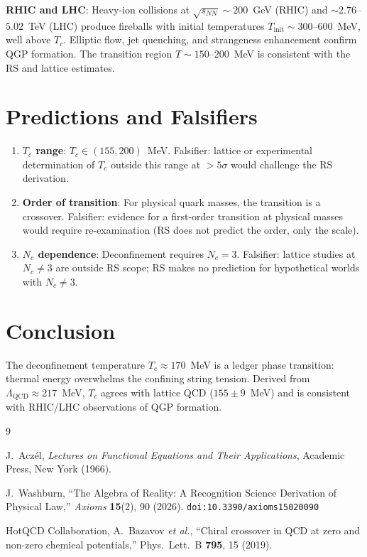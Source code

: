 \documentclass[12pt,a4paper]{article}
\theoremstyle{definition}
\theoremstyle{remark}
\begin{document}
\textbf{RHIC and LHC}: Heavy-ion collisions at $\sqrt{s_{NN}} \sim
200$~GeV (RHIC) and $\sim 2.76$--$5.02$~TeV (LHC) produce
fireballs with initial temperatures $T_{\mathrm{init}} \sim
300$--$600$~MeV, well above $T_c$.  Elliptic flow, jet quenching,
and strangeness enhancement confirm QGP formation.  The transition
region $T \sim 150$--$200$~MeV is consistent with the RS and lattice
estimates.

\section{Predictions and Falsifiers}
\label{sec:predictions}

\begin{enumerate}[label=(\roman*)]
\item \textbf{$T_c$ range}: $T_c \in (155, 200)$~MeV.  Falsifier:
lattice or experimental determination of $T_c$ outside this range at
$> 5\sigma$ would challenge the RS derivation.

\item \textbf{Order of transition}: For physical quark masses, the
transition is a crossover.  Falsifier: evidence for a first-order
transition at physical masses would require re-examination (RS
does not predict the order, only the scale).

\item \textbf{$N_c$ dependence}: Deconfinement requires $N_c = 3$.
Falsifier: lattice studies at $N_c \neq 3$ are outside RS scope;
RS makes no prediction for hypothetical worlds with $N_c \neq 3$.
\end{enumerate}

\section{Conclusion}
\label{sec:conclusion}

The deconfinement temperature $T_c \approx 170$~MeV is a ledger
phase transition: thermal energy overwhelms the confining string
tension.  Derived from $\Lambda_{\mathrm{QCD}} \approx 217$~MeV,
$T_c$ agrees with lattice QCD ($155 \pm 9$~MeV) and is consistent
with RHIC/LHC observations of QGP formation.

\begin{thebibliography}{9}

J.~Acz\'el, \emph{Lectures on Functional Equations and Their Applications},
Academic Press, New York (1966).

J.~Washburn, ``The Algebra of Reality: A Recognition Science Derivation
of Physical Law,'' \emph{Axioms} \textbf{15}(2), 90 (2026).
\texttt{doi:10.3390/axioms15020090}

HotQCD Collaboration, A.~Bazavov \textit{et al.},
``Chiral crossover in QCD at zero and non-zero chemical potentials,''
Phys.\ Lett.\ B \textbf{795}, 15 (2019).
\end{thebibliography}
\end{document}
